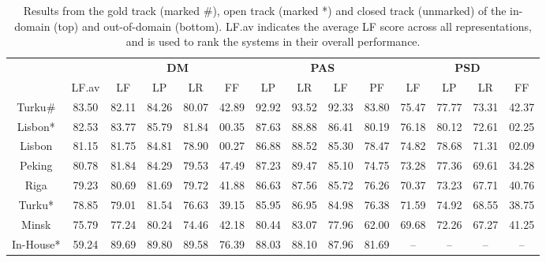 \begin{table}
\begin{tabular}{@{}cccccccccccccc@{}}
        \\
        \toprule
        \multicolumn{1}{c}{ }
        & \multicolumn{1}{c}{ }
        & \multicolumn{4}{c}{\textbf{DM}}
        & \multicolumn{4}{c}{\textbf{PAS}}
        & \multicolumn{4}{c}{\textbf{PSD}} \\
        \cmidrule(lr){3-6}
        \cmidrule(lr){7-10}
        \cmidrule(lr){11-14}
        &
        LF.av &
        LF & LP & LR & FF &
        LP & LR & LF & PF &
        LF & LP & LR & FF \\
        \midrule
        Turku\# & 83.50 & 82.11 & 84.26 & 80.07 & 42.89 & 92.92 & 93.52 & 92.33 & 83.80 & 75.47 & 77.77 & 73.31 & 42.37 \\
        Lisbon* & 82.53 & 83.77 & 85.79 & 81.84 & 00.35 & 87.63 & 88.88 & 86.41 & 80.19 & 76.18 & 80.12 & 72.61 & 02.25 \\
        Lisbon & 81.15 & 81.75 & 84.81 & 78.90 & 00.27 & 86.88 & 88.52 & 85.30 & 78.47 & 74.82 & 78.68 & 71.31 & 02.09 \\
        Peking & 80.78 & 81.84 & 84.29 & 79.53 & 47.49 & 87.23 & 89.47 & 85.10 & 74.75 & 73.28 & 77.36 & 69.61 & 34.28 \\
        Riga & 79.23 & 80.69 & 81.69 & 79.72 & 41.88 & 86.63 & 87.56 & 85.72 & 76.26 & 70.37 & 73.23 & 67.71 & 40.76 \\
        Turku* & 78.85 & 79.01 & 81.54 & 76.63 & 39.15 & 85.95 & 86.95 & 84.98 & 76.38 & 71.59 & 74.92 & 68.55 & 38.75 \\
        Minsk & 75.79 & 77.24 & 80.24 & 74.46 & 42.18 & 80.44 & 83.07 & 77.96 & 62.00 & 69.68 & 72.26 & 67.27 & 41.25 \\
        In-House* & 59.24 & 89.69 & 89.80 & 89.58 & 76.39 & 88.03 & 88.10 & 87.96 & 81.69 & – & – & – & – \\
        \bottomrule
    \end{tabular}
    \caption{Results from the gold track (marked \#), open track (marked *) and closed track (unmarked) of the in-domain (top) and out-of-domain (bottom). LF.av indicates the average LF score across all representations, and is used to rank the systems in their overall performance.}
    \label{fig:results}
\end{table}